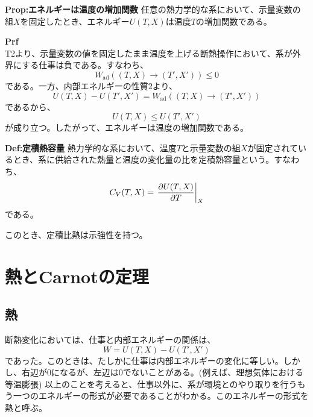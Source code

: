 \documentclass[a4paper,11pt]{jsarticle}
\numberwithin{equation}{section}
\begin{document}
\begin{itembox}[l]{\textbf{Prop:エネルギーは温度の増加関数}}
    任意の熱力学的な系において、示量変数の組$X$を固定したとき、エネルギー$U(T,X)$は温度$T$の増加関数である。

\end{itembox}
\textbf{Prf}\\
T2より、示量変数の値を固定したまま温度を上げる断熱操作において、系が外界にする仕事は負である。すなわち、
\begin{equation}
    W_{\text{ad}}((T,X)\rightarrow (T',X')) \leq 0
\end{equation}
である。一方、内部エネルギーの性質2より、
\begin{equation}
    U(T,X) - U(T',X') = W_{\text{ad}}((T,X)\rightarrow (T',X'))
\end{equation}
であるから、
\begin{equation}
    U(T,X) \leq U(T',X')
\end{equation}
が成り立つ。したがって、エネルギーは温度の増加関数である。\\

\begin{itembox}[l]{\textbf{Def:定積熱容量}}
    熱力学的な系において、温度$T$と示量変数の組$X$が固定されているとき、系に供給された熱量と温度の変化量の比を定積熱容量という。すなわち、
    \begin{equation}
        C_V(T,X) = \left.\pdv{U(T,X)}{T}\right|_{X}
    \end{equation}
    である。

\end{itembox}
このとき、定積比熱は示強性を持つ。\\

\section{熱とCarnotの定理}
\subsection{熱}
断熱変化においては、仕事と内部エネルギーの関係は、
\begin{equation}
    W = U(T,X) - U(T',X')
\end{equation}
であった。このときは、たしかに仕事は内部エネルギーの変化に等しい。しかし、右辺が$0$になるが、左辺は$0$でないことがある。(例えば、理想気体における等温膨張)
以上のことを考えると、仕事以外に、系が環境とのやり取りを行うもう一つのエネルギーの形式が必要であることがわかる。このエネルギーの形式を熱と呼ぶ。\\
\end{document}
